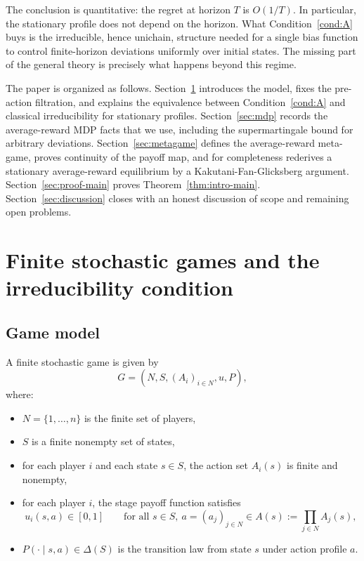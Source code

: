 \documentclass[11pt]{article}
\theoremstyle{definition}
\newcommand{\1}{\mathbf{1}}
\begin{document}
The conclusion is quantitative: the regret at horizon $T$ is $O(1/T)$. In particular, the stationary profile does not depend on the horizon. What Condition~\ref{cond:A} buys is the irreducible, hence unichain, structure needed for a single bias function to control finite-horizon deviations uniformly over initial states. The missing part of the general theory is precisely what happens beyond this regime.

The paper is organized as follows. Section~\ref{sec:model} introduces the model, fixes the pre-action filtration, and explains the equivalence between Condition~\ref{cond:A} and classical irreducibility for stationary profiles. Section~\ref{sec:mdp} records the average-reward MDP facts that we use, including the supermartingale bound for arbitrary deviations. Section~\ref{sec:metagame} defines the average-reward meta-game, proves continuity of the payoff map, and for completeness rederives a stationary average-reward equilibrium by a Kakutani-Fan-Glicksberg argument. Section~\ref{sec:proof-main} proves Theorem~\ref{thm:intro-main}. Section~\ref{sec:discussion} closes with an honest discussion of scope and remaining open problems.

\section{Finite stochastic games and the irreducibility condition}\label{sec:model}

\subsection{Game model}

A finite stochastic game is given by
\[
G=(N,S,(A_i)_{i\in N},u,P),
\]
where:
\begin{itemize}[leftmargin=2.3em]
\item $N=\{1,\dots,n\}$ is the finite set of players,
\item $S$ is a finite nonempty set of states,
\item for each player $i$ and each state $s\in S$, the action set $A_i(s)$ is finite and nonempty,
\item for each player $i$, the stage payoff function satisfies
\[
 u_i(s,a)\in[0,1]\qquad\text{for all }s\in S,\ a=(a_j)_{j\in N}\in A(s):=\prod_{j\in N}A_j(s),
\]
\item $P(\cdot\mid s,a)\in\Delta(S)$ is the transition law from state $s$ under action profile $a$.
\end{itemize}
\end{document}
